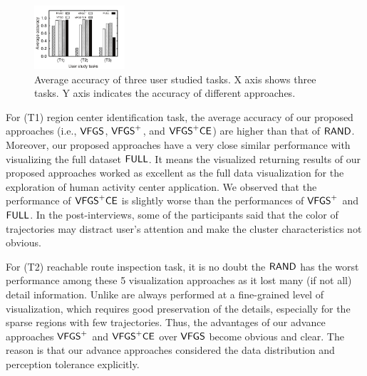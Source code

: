 \begin{figure}[t]
	\centering
	\includegraphics[width=0.3\textwidth]{pictures/userstudy}
	\vspace{-4mm}
	\caption{Average accuracy of three user studied tasks. X axis shows three tasks. Y axis indicates the accuracy of different approaches.}
	\label{fig:accuracy}
	\vspace{-6mm}
\end{figure}

For (T1) region center identification task, the average accuracy of our proposed approaches (i.e., $\mathsf{VFGS}$, $\mathsf{VFGS}^{+}$, and $\mathsf{VFGS}^{+}\mathsf{CE}$) are higher than that of $\mathsf{RAND}{}$.
Moreover, our proposed approaches have a very close similar performance with visualizing the full dataset $\mathsf{FULL}$.
It means the visualized returning results of our proposed approaches worked as excellent as the full data visualization for the exploration of human activity center application.
We observed that the performance of $\mathsf{VFGS}^{+}\mathsf{CE}$ is slightly worse than the performances of $\mathsf{VFGS}^{+}$ and $\mathsf{FULL}$.
In the post-interviews, some of the participants said that the color of trajectories may distract user's attention and make the cluster characteristics not obvious.



For (T2) reachable route inspection task, it is no doubt the $\mathsf{RAND}$ has the worst performance among these 5 visualization approaches as it lost many (if not all) detail information.
Unlike  are always performed at a fine-grained level of visualization,
which requires good preservation of the details, especially for the sparse regions with few trajectories.
Thus, the advantages of our advance approaches $\mathsf{VFGS}^{+}$ and $\mathsf{VFGS}^{+}\mathsf{CE}$ over $\mathsf{VFGS}$ become obvious and clear.
The reason is that our advance approaches considered the data distribution and perception tolerance explicitly.

